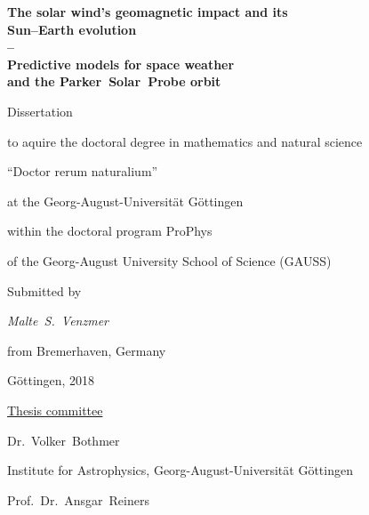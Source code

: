 
\begin{titlepage}
	\begin{center}
		\vspace*{\fill}
		{\LARGE\sffamily
			\textbf{The solar wind's geomagnetic impact and its\\Sun--Earth evolution\\--\\Predictive models for space weather\\and the Parker~Solar~Probe orbit}\\
		}
		\renewcommand{\baselinestretch}{1.5}

		\vspace{3\baselineskip}
		\Large\rmfamily
		Dissertation
		
		to aquire the doctoral degree in mathematics and natural science	%
		
		``Doctor rerum naturalium''
		
		at the Georg-August-Universität Göttingen
		
		\vspace{\baselineskip}
		within the doctoral program ProPhys
		
		of the Georg-August University School of Science (GAUSS)
		
		\vspace{3\baselineskip}
		Submitted by
		
		\textit{%
			Malte~S.~Venzmer
		}
		
		from Bremerhaven, Germany
		
		\vspace{3\baselineskip}
		Göttingen, 2018
		\vspace{\fill}
	\end{center}
\end{titlepage}

\newpage


\vspace*{\fill}

\noindent \underline{Thesis committee}
\vspace{\baselineskip}

Dr.~Volker~Bothmer

Institute for Astrophysics, Georg-August-Universität Göttingen
\vspace{\baselineskip}

Prof.~Dr.~Ansgar~Reiners

